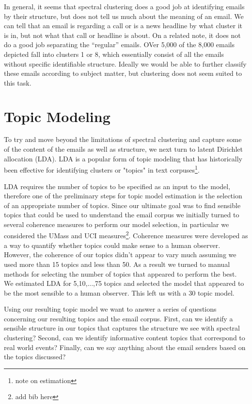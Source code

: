 \documentclass[12pt]{article}
\theoremstyle{definition}
\theoremstyle{algodesc}
\begin{document}
In general, it seems that spectral clustering does a good job at identifying emails by their structure, but does not tell us much about the meaning of an email. We can tell that an email is regarding a call or is a news headline by what cluster it is in, but not what that call or headline is about. On a related note, it does not do a good job separating the ``regular'' emails. OVer 5,000 of the 8,000 emails depicted fall into clusters 1 or 8, which essentially consist of all the emails without specific identifiable structure. Ideally we would be able to further classify these emails according to subject matter, but clustering does not seem suited to this task.


\section{Topic Modeling}

To try and move beyond the limitations of spectral clustering and capture some of the content of the emails as well as structure, we next turn to latent Dirichlet allocation (LDA).  LDA is a popular form of topic modeling that has historically been effective for identifying clusters or "topics" in text corpuses\footnote{note on estimation}.  

LDA requires the number of topics to be specified as an input to the model, therefore one of the preliminary steps for topic model estimation is the selection of an appropriate number of topics.  Since our ultimate goal was to find sensible topics that could be used to understand the email corpus we initially turned to several coherence measures to perform our model selection, in particular we considered the UMass and UCI measures\footnote{add bib here}.  Coherence measures were developed as a way to quantify whether topics could make sense to a human observer.  However, the coherence of our topics didn't appear to vary much assuming we used more than 15 topics and less than 50.  As a result we turned to manual methods for selecting the number of topics that appeared to perform the best.  We estimated LDA for 5,10,...,75 topics and selected the model that appeared to be the most sensible to a human observer.  This left us with a 30 topic model.

Using our resulting topic model we want to answer a series of questions concerning our resulting topics and the email corpus.  First, can we identify a sensible structure in our topics that captures the structure we see with spectral clustering?  Second, can we identify informative content topics that correspond to real world events?  Finally, can we say anything about the email senders based on the topics discussed?
\end{document}
